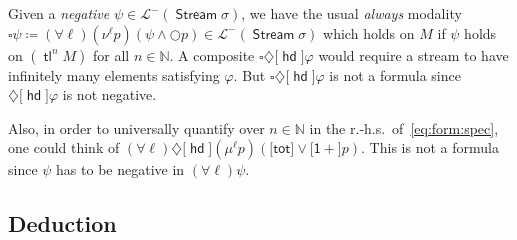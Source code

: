 \documentclass[%
  a4paper,
  UKenglish,
  cleveref,
  autoref,
  thm-restate,
  numberwithinsect,
]{lipics-v2021}
\newcommand\deq\coloneqq
\newcommand\NN{\mathbb{N}}
\newcommand\Next{\mathord{\bigcirc}}
\renewcommand{\Box}{\square}
\newcommand{\Diam}{\diamondsuit}
\newcommand\term[1]{\mathsf{#1}}
\newcommand\type[1]{\term{#1}}
\newcommand\hd{\mathop{\term{hd}}}
\newcommand\tl{\mathop{\term{tl}}}
\newcommand\Stream{\mathop{\type{Stream}}}
\newcommand\PTbis{\sigma}	%
\newcommand\itvarbis{\ell}
\newcommand\tot{\term{tot}}
\newcommand\FP{p}
\newcommand\finmu{\mu}
\newcommand\finnu{\nu}
\newcommand\Lang{\mathcal{L}}
\newcommand\form[1]{\lbrack #1 \rbrack}
\begin{document}
\begin{remark}
\label{rem:form:fix}
Given a \emph{negative} $\psi \in \Lang^-(\Stream\PTbis)$,
we have
the usual \emph{always} modality
\(
  \Box \psi
  \deq
  (\forall \itvarbis)(\finnu^\itvarbis \FP)(\psi \land \Next\FP)
  \in \Lang^-(\Stream\PTbis)
\)
which holds on
$M$ if $\psi$ holds on $(\tl^n M)$ for all $n \in \NN$.
A composite $\Box\Diam\form\hd\varphi$ would require a stream
to have infinitely many elements satisfying $\varphi$.
But $\Box\Diam\form\hd\varphi$ is not a formula since
$\Diam\form\hd\varphi$ is not negative.

Also, in order to 
universally quantify over $n \in \NN$
in the r.-h.s.\ of~\eqref{eq:form:spec},
one could think of
\(
  (\forall \itvarbis)\Diam\form\hd (\finmu^\itvarbis \FP)
  (\form\tot \lor \form{\term{1+}}\FP)
\).
This is not a formula
since $\psi$ has to be negative in $(\forall \itvarbis)\psi$.
\lipicsEnd
\end{remark}





\subsection{Deduction}
\label{sec:deduction}
\end{document}
